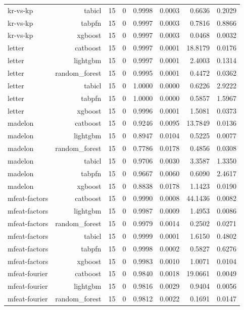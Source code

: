 \begin{table}[htbp]
\begin{tabular}{lrrrrrrr}
kr-vs-kp & tabicl & 15 & 0 & 0.9998 & 0.0003 & 0.6636 & 0.2029 \\
kr-vs-kp & tabpfn & 15 & 0 & 0.9997 & 0.0003 & 0.7816 & 0.8866 \\
kr-vs-kp & xgboost & 15 & 0 & 0.9997 & 0.0003 & 0.0468 & 0.0032 \\
letter & catboost & 15 & 0 & 0.9997 & 0.0001 & 18.8179 & 0.0176 \\
letter & lightgbm & 15 & 0 & 0.9997 & 0.0001 & 2.4003 & 0.1314 \\
letter & random\_forest & 15 & 0 & 0.9995 & 0.0001 & 0.4472 & 0.0362 \\
letter & tabicl & 15 & 0 & 1.0000 & 0.0000 & 0.6226 & 2.9222 \\
letter & tabpfn & 15 & 0 & 1.0000 & 0.0000 & 0.5857 & 1.5967 \\
letter & xgboost & 15 & 0 & 0.9996 & 0.0001 & 1.5081 & 0.0373 \\
madelon & catboost & 15 & 0 & 0.9246 & 0.0095 & 13.7849 & 0.0136 \\
madelon & lightgbm & 15 & 0 & 0.8947 & 0.0104 & 0.5225 & 0.0077 \\
madelon & random\_forest & 15 & 0 & 0.7786 & 0.0178 & 0.4856 & 0.0308 \\
madelon & tabicl & 15 & 0 & 0.9706 & 0.0030 & 3.3587 & 1.3350 \\
madelon & tabpfn & 15 & 0 & 0.9667 & 0.0060 & 0.6090 & 2.4617 \\
madelon & xgboost & 15 & 0 & 0.8838 & 0.0178 & 1.1423 & 0.0190 \\
mfeat-factors & catboost & 15 & 0 & 0.9990 & 0.0008 & 44.1436 & 0.0082 \\
mfeat-factors & lightgbm & 15 & 0 & 0.9987 & 0.0009 & 1.4953 & 0.0086 \\
mfeat-factors & random\_forest & 15 & 0 & 0.9979 & 0.0014 & 0.2502 & 0.0271 \\
mfeat-factors & tabicl & 15 & 0 & 0.9999 & 0.0001 & 1.6150 & 0.4802 \\
mfeat-factors & tabpfn & 15 & 0 & 0.9998 & 0.0002 & 0.5827 & 0.6276 \\
mfeat-factors & xgboost & 15 & 0 & 0.9983 & 0.0010 & 1.0071 & 0.0104 \\
mfeat-fourier & catboost & 15 & 0 & 0.9840 & 0.0018 & 19.0661 & 0.0049 \\
mfeat-fourier & lightgbm & 15 & 0 & 0.9816 & 0.0029 & 0.9404 & 0.0056 \\
mfeat-fourier & random\_forest & 15 & 0 & 0.9812 & 0.0022 & 0.1691 & 0.0147 \\

\end{tabular}
\end{table}
